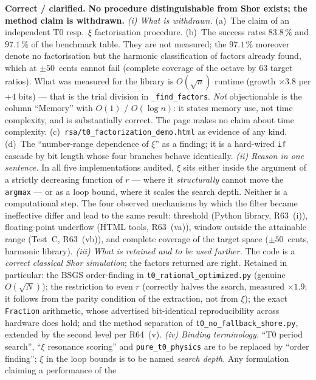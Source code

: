 \smallskip\noindent\textbf{Correct / clarified.}\quad
\textbf{No procedure distinguishable from Shor exists; the method claim
is withdrawn.}
\emph{(i) What is withdrawn.} (a)~The claim of an independent T0 resp.\
$\xi$ factorisation procedure. (b)~The success rates $83.8\,\%$ and $97.1\,\%$ of the
benchmark table. They are not measured; the $97.1\,\%$ moreover denote
no factorisation but the harmonic classification of factors already
found, which at $\pm 50$~cents cannot fail (complete coverage of the
octave by 63 target ratios). What was measured for the library is
$O(\sqrt{n})$ runtime (growth $\times 3.8$ per $+4$ bits) --- that is
the trial division in \texttt{\_find\_factors}. \emph{Not} objectionable
is the column \enquote{Memory} with $O(1)$ / $O(\log n)$: it states
memory use, not time complexity, and is substantially correct. The page
makes no claim about time complexity. (c)~\texttt{rsa/t0\_factorization\_demo.html}
as evidence of any kind. (d)~The \enquote{number-range dependence of
$\xi$} as a finding; it is a hard-wired \texttt{if} cascade by bit
length whose four branches behave identically.
\emph{(ii) Reason in one sentence.} In all five implementations audited,
$\xi$ sits either inside the argument of a strictly decreasing function
of $r$ --- where it \emph{structurally} cannot move the \texttt{argmax}
--- or as a loop bound, where it scales the search depth. Neither is a
computational step. The four observed mechanisms by which the filter
became ineffective differ and lead to the same result: threshold (Python
library, R63~(i)), floating-point underflow (HTML tools, R63~(va)),
window outside the attainable range (Test~C, R63~(vb)), and complete
coverage of the target space ($\pm 50$~cents, harmonic library).
\emph{(iii) What is retained and to be used further.} The code is a
\emph{correct classical Shor simulation}; the factors returned are right.
Retained in particular: the BSGS order-finding in
\texttt{t0\_rational\_optimized.py} (genuine $O(\sqrt{N})$); the
restriction to even $r$ (correctly halves the search, measured
$\times 1.9$; it follows from the parity condition of the extraction, not
from $\xi$); the exact \texttt{Fraction} arithmetic, whose advertised
bit-identical reproducibility across hardware does hold; and the method
separation of \texttt{t0\_no\_fallback\_shore.py}, extended by the second
level per R64~(v).
\emph{(iv) Binding terminology.} \enquote{T0 period search},
\enquote{$\xi$ resonance scoring} and \texttt{pure\_t0\_physics} are to be
replaced by \enquote{order finding}; $\xi$ in the loop bounds is to be
named \emph{search depth}. Any formulation claiming a performance of the
